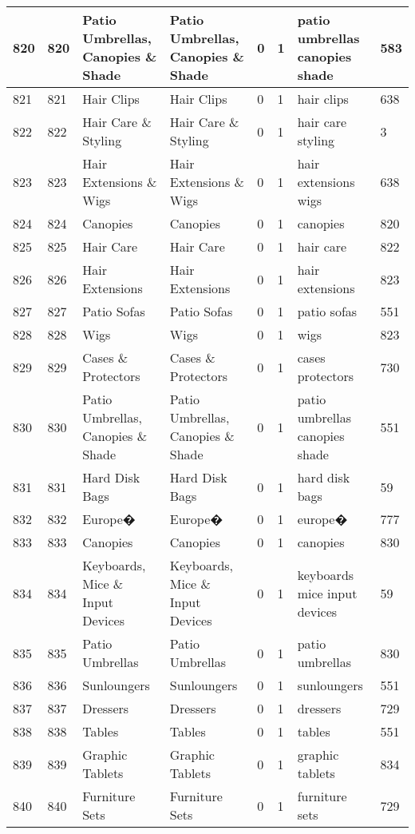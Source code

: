 \begin{longtable}{|l|l|l|l|l|l|l|l|}
820 & 820 & Patio Umbrellas, Canopies \& Shade & Patio Umbrellas, Canopies \& Shade & 0 & 1 & patio umbrellas canopies shade & 583 \\ \hline 
821 & 821 & Hair Clips & Hair Clips & 0 & 1 & hair clips & 638 \\ \hline 
822 & 822 & Hair Care \& Styling & Hair Care \& Styling & 0 & 1 & hair care styling & 3 \\ \hline 
823 & 823 & Hair Extensions \& Wigs & Hair Extensions \& Wigs & 0 & 1 & hair extensions wigs & 638 \\ \hline 
824 & 824 & Canopies & Canopies & 0 & 1 & canopies & 820 \\ \hline 
825 & 825 & Hair Care & Hair Care & 0 & 1 & hair care & 822 \\ \hline 
826 & 826 & Hair Extensions & Hair Extensions & 0 & 1 & hair extensions & 823 \\ \hline 
827 & 827 & Patio Sofas & Patio Sofas & 0 & 1 & patio sofas & 551 \\ \hline 
828 & 828 & Wigs & Wigs & 0 & 1 & wigs & 823 \\ \hline 
829 & 829 & Cases \& Protectors & Cases \& Protectors & 0 & 1 & cases protectors & 730 \\ \hline 
830 & 830 & Patio Umbrellas, Canopies \& Shade & Patio Umbrellas, Canopies \& Shade & 0 & 1 & patio umbrellas canopies shade & 551 \\ \hline 
831 & 831 & Hard Disk Bags & Hard Disk Bags & 0 & 1 & hard disk bags & 59 \\ \hline 
832 & 832 & Europe� & Europe� & 0 & 1 & europe� & 777 \\ \hline 
833 & 833 & Canopies & Canopies & 0 & 1 & canopies & 830 \\ \hline 
834 & 834 & Keyboards, Mice \& Input Devices & Keyboards, Mice \& Input Devices & 0 & 1 & keyboards mice input devices & 59 \\ \hline 
835 & 835 & Patio Umbrellas & Patio Umbrellas & 0 & 1 & patio umbrellas & 830 \\ \hline 
836 & 836 & Sunloungers & Sunloungers & 0 & 1 & sunloungers & 551 \\ \hline 
837 & 837 & Dressers & Dressers & 0 & 1 & dressers & 729 \\ \hline 
838 & 838 & Tables & Tables & 0 & 1 & tables & 551 \\ \hline 
839 & 839 & Graphic Tablets & Graphic Tablets & 0 & 1 & graphic tablets & 834 \\ \hline 
840 & 840 & Furniture Sets & Furniture Sets & 0 & 1 & furniture sets & 729 \\ \hline 

\end{longtable}
